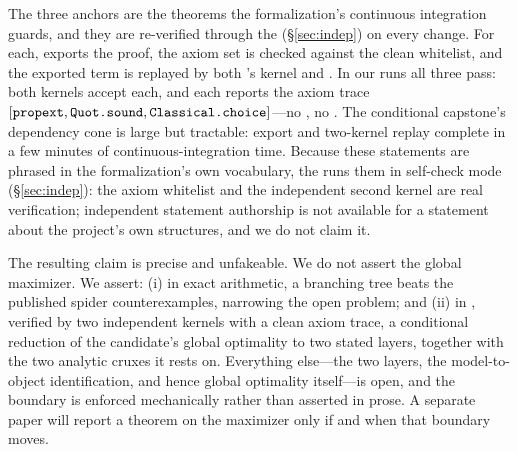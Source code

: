 The three \Lean{} anchors are the theorems the formalization's continuous integration
guards, and they are re-verified through the \Comparator{} (\S\ref{sec:indep}) on
every change. For each,  exports the proof, the axiom set is checked
against the clean whitelist, and the exported term is replayed by both \Lean's kernel
and \nanoda. In our runs all three pass: both kernels accept each, and each reports the
axiom trace $[\texttt{propext}, \texttt{Quot.sound}, \texttt{Classical.choice}]$---no
, no . The conditional capstone's dependency cone is
large but tractable: export and two-kernel replay complete in a few minutes of
continuous-integration time. Because these statements are phrased in the
formalization's own vocabulary, the \Comparator{} runs them in self-check mode
(\S\ref{sec:indep}): the axiom whitelist and the independent second kernel are real
verification; independent statement authorship is not available for a statement about
the project's own structures, and we do not claim it.

The resulting claim is precise and unfakeable. We do not assert the global maximizer.
We assert: (i) in exact arithmetic, a branching tree beats the published spider
counterexamples, narrowing the open problem; and (ii) in \Lean, verified by two
independent kernels with a clean axiom trace, a conditional reduction of the
candidate's global optimality to two stated layers, together with the two analytic
cruxes it rests on. Everything else---the two layers, the model-to-object
identification, and hence global optimality itself---is open, and the boundary is
enforced mechanically rather than asserted in prose. A separate paper will report a
theorem on the maximizer only if and when that boundary moves.
